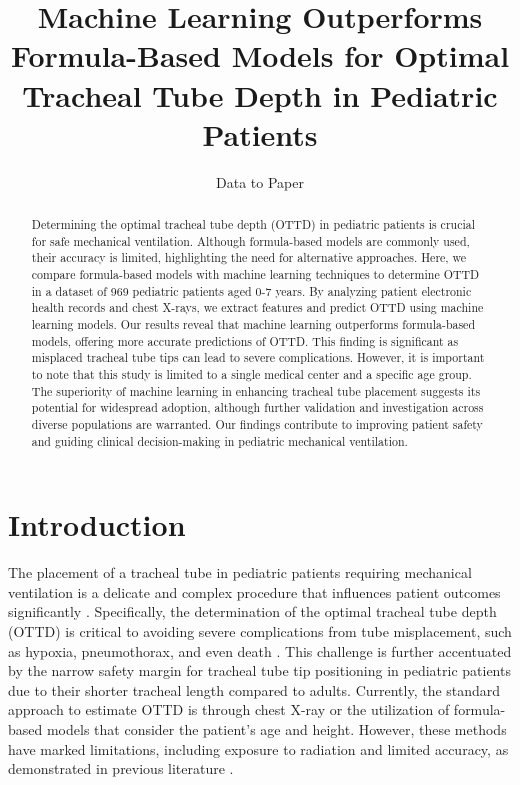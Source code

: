 \documentclass[11pt]{article}
\title{Machine Learning Outperforms Formula-Based Models for Optimal Tracheal Tube Depth in Pediatric Patients}
\author{Data to Paper}
\begin{document}
\maketitle
\begin{abstract}
Determining the optimal tracheal tube depth (OTTD) in pediatric patients is crucial for safe mechanical ventilation. Although formula-based models are commonly used, their accuracy is limited, highlighting the need for alternative approaches. Here, we compare formula-based models with machine learning techniques to determine OTTD in a dataset of 969 pediatric patients aged 0-7 years. By analyzing patient electronic health records and chest X-rays, we extract features and predict OTTD using machine learning models. Our results reveal that machine learning outperforms formula-based models, offering more accurate predictions of OTTD. This finding is significant as misplaced tracheal tube tips can lead to severe complications. However, it is important to note that this study is limited to a single medical center and a specific age group. The superiority of machine learning in enhancing tracheal tube placement suggests its potential for widespread adoption, although further validation and investigation across diverse populations are warranted. Our findings contribute to improving patient safety and guiding clinical decision-making in pediatric mechanical ventilation.
\end{abstract}
\section*{Introduction}

The placement of a tracheal tube in pediatric patients requiring mechanical ventilation is a delicate and complex procedure that influences patient outcomes significantly \cite{Weiss2005AppropriatePO}. Specifically, the determination of the optimal tracheal tube depth (OTTD) is critical to avoiding severe complications from tube misplacement, such as hypoxia, pneumothorax, and even death \cite{Rost2022TrachealTM}. This challenge is further accentuated by the narrow safety margin for tracheal tube tip positioning in pediatric patients due to their shorter tracheal length compared to adults. Currently, the standard approach to estimate OTTD is through chest X-ray or the utilization of formula-based models that consider the patient's age and height. However, these methods have marked limitations, including exposure to radiation and limited accuracy, as demonstrated in previous literature \cite{Grmec2002ComparisonOT, Tareerath2021AccuracyOA}.
\end{document}

